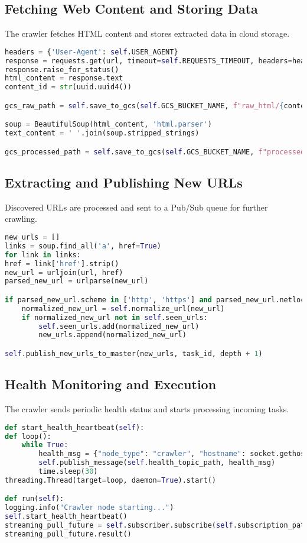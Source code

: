 \documentclass[12pt,a4paper]{report}
\begin{document}
\subsection{Fetching Web Content and Storing Data}
The crawler fetches HTML content and stores extracted data in cloud storage.
\begin{lstlisting}[language=Python]
headers = {'User-Agent': self.USER_AGENT}
response = requests.get(url, timeout=self.REQUESTS_TIMEOUT, headers=headers)
response.raise_for_status()
html_content = response.text
content_id = str(uuid.uuid4())

gcs_raw_path = self.save_to_gcs(self.GCS_BUCKET_NAME, f"raw_html/{content_id}.html", html_content, "text/html")

soup = BeautifulSoup(html_content, 'html.parser')
text_content = ' '.join(soup.stripped_strings)

gcs_processed_path = self.save_to_gcs(self.GCS_BUCKET_NAME, f"processed_text/{content_id}.txt", text_content, "text/plain")
\end{lstlisting}

\subsection{Extracting and Publishing New URLs}
Discovered URLs are processed and sent to a Pub/Sub queue for further crawling.
\begin{lstlisting}[language=Python]
new_urls = []
links = soup.find_all('a', href=True)
for link in links:
href = link['href'].strip()
new_url = urljoin(url, href)
parsed_new_url = urlparse(new_url)

if parsed_new_url.scheme in ['http', 'https'] and parsed_new_url.netloc:
    normalized_new_url = self.normalize_url(new_url)
    if normalized_new_url not in self.seen_urls:
        self.seen_urls.add(normalized_new_url)
        new_urls.append(normalized_new_url)

self.publish_new_urls_to_master(new_urls, task_id, depth + 1)
\end{lstlisting}
\newpage
\subsection{Health Monitoring and Execution}
The crawler sends periodic health status and starts processing incoming tasks.
\begin{lstlisting}[language=Python]
def start_health_heartbeat(self):
def loop():
    while True:
        health_msg = {"node_type": "crawler", "hostname": socket.gethostname(), "status": "online"}
        self.publish_message(self.health_topic_path, health_msg)
        time.sleep(30)
threading.Thread(target=loop, daemon=True).start()

def run(self):
logging.info("Crawler node starting...")
self.start_health_heartbeat()
streaming_pull_future = self.subscriber.subscribe(self.subscription_path, callback=self.process_crawl_task)
streaming_pull_future.result()
\end{lstlisting}
\end{document}
